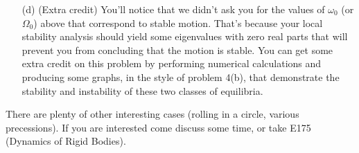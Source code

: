 \documentclass[12pt,letterpaper]{hmcpset}
\begin{document}
	\newpage
	
	\begin{problem}[2 (cont.)]
	\begin{enumerate}
		\item[(d)] (Extra credit) You'll notice that we didn't ask you for the values of $\omega_0$ (or $\Omega_0$) above
		that correspond to stable motion. That’s because your local stability analysis should
		yield some eigenvalues with zero real parts that will prevent you from concluding that
		the motion is stable. You can get some extra credit on this problem by performing
		numerical calculations and producing some graphs, in the style of problem 4(b), that
		demonstrate the stability and instability of these two classes of equilibria.
	\end{enumerate}
	There are plenty of other interesting cases (rolling in a circle, various precessions). If you
	are interested come discuss some time, or take E175 (Dynamics of Rigid Bodies).
	\end{problem}
	
	\begin{solution}
		\vfill
	\end{solution}
	
	\newpage
	
\end{document}
